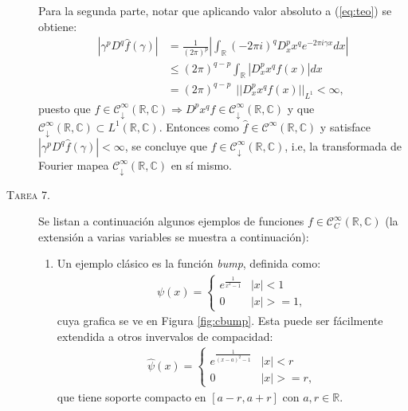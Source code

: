 \documentclass[spanish, fleqn]{article}
\begin{document}
\begin{description}
	Para la segunda parte, notar que aplicando valor absoluto a (\ref{eq:teo}) se obtiene:
	\begin{align*}
		\left|\gamma^p D^q \widehat{f}(\gamma)\right| &= \frac{1}{(2 \pi)^p} \left| \int_{\mathbb{R}} (-2 \pi i)^q D_{x}^{p} x^q e^{-2 \pi i \gamma x} dx \right| \\
		&\leq (2 \pi)^{q-p} \int_{\mathbb{R}} \left| D_{x}^{p} x^q f(x) \right| dx \\
		&= (2 \pi)^{q-p} \ \ ||D_{x}^p x^q f(x)||_{L^1} < \infty,
	\end{align*}
	puesto que $f \in \mathcal{C}_{\downarrow}^\infty(\mathbb{R},\mathbb{C}) \Rightarrow  D^p x^q f \in \mathcal{C}_{\downarrow}^\infty(\mathbb{R},\mathbb{C})$ y que $\mathcal{C}_{\downarrow}^\infty(\mathbb{R},\mathbb{C}) \subset L^1(\mathbb{R},\mathbb{C})$. Entonces como $\widehat{f} \in \mathcal{C}^\infty(\mathbb{R},\mathbb{C})$ y satisface $\left|\gamma^p D^q \widehat{f}(\gamma)\right| < \infty$, se concluye que $\widehat{f} \in \mathcal{C}_{\downarrow}^\infty(\mathbb{R},\mathbb{C})$, i.e, la transformada de Fourier mapea $\mathcal{C}_{\downarrow}^\infty(\mathbb{R},\mathbb{C})$ en sí mismo.




 
	\item[\textsc{Tarea 7.}] Se listan a continuación algunos ejemplos de funciones $f \in \mathcal{C}_{C}^{\infty}(\mathbb{R},\mathbb{C})$ (la extensión a varias variables se muestra a continuación):
	\begin{enumerate}
		\item Un ejemplo clásico es la función \textit{bump}, definida como:
		\begin{align*}
		\psi(x) =
		\begin{cases}
		e^{\frac{1}{x^2-1}} & |x|<1 \\
		0 & |x|>= 1,
		\end{cases}	
		\end{align*}
		cuya grafica se ve en Figura \ref{fig:cbump}. Esta puede ser fácilmente extendida a otros invervalos de compacidad:
		\begin{align*}
		\widehat{\psi}(x) =
		\begin{cases}
		e^{\frac{1}{(x-a)^2-1}} & |x|<r \\
		0 & |x|>= r,
		\end{cases}	
		\end{align*}
		que tiene soporte compacto en $[a-r, a+r]$ con $a,r \in \mathbb{R}$. 


\end{enumerate}
\end{description}
\end{document}
